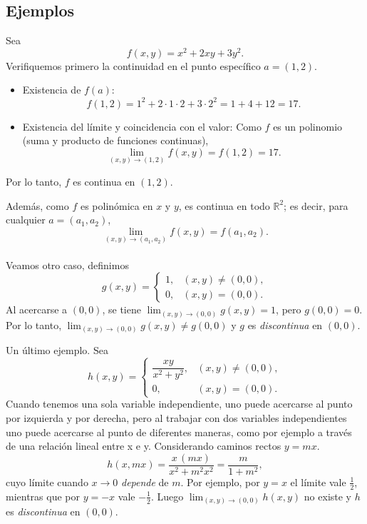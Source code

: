 \documentclass{article}
\begin{document}
\subsection*{Ejemplos}

Sea
\[
f(x,y)=x^{2}+2xy+3y^{2}.
\]
Verifiquemos primero la continuidad en el punto específico \(a=(1,2)\).

\begin{itemize}
  \item {\color{teal}Existencia de \(f(a)\):} 
  \[
  f(1,2)=1^{2}+2\cdot1\cdot2+3\cdot2^{2}=1+4+12=17.
  \]
  \item {\color{teal}Existencia del límite y coincidencia con el valor:}
  Como \(f\) es un polinomio (suma y producto de funciones continuas),
  \[
  \lim_{(x,y)\to(1,2)}f(x,y)
  = f(1,2)=17.
  \]
\end{itemize}
Por lo tanto, {\color{teal}\(f\) es continua en \((1,2)\)}.

Además, como \(f\) es polinómica en \(x\) y \(y\), es {\color{teal}continua en todo \(\mathbb{R}^{2}\)}; es decir, para cualquier \(a=(a_1,a_2)\),
\[
\lim_{(x,y)\to(a_1,a_2)} f(x,y)=f(a_1,a_2).
\]
\\
Veamos otro caso, definimos
\[
g(x,y)=
\begin{cases}
1, & (x,y)\neq(0,0),\\[4pt]
0, & (x,y)=(0,0).
\end{cases}
\]
Al acercarse a \((0,0)\), se tiene
\(\displaystyle \lim_{(x,y)\to(0,0)} g(x,y)=1\),
pero \(g(0,0)=0\).
{\color{teal}Por lo tanto, \(\displaystyle \lim_{(x,y)\to(0,0)} g(x,y)\neq g(0,0)\) y \(g\) es \emph{discontinua} en \((0,0)\).}

Un último ejemplo. Sea
\[
h(x,y)=
\begin{cases}
\dfrac{xy}{x^{2}+y^{2}}, & (x,y)\neq(0,0),\\[8pt]
0, & (x,y)=(0,0).
\end{cases}
\]
Cuando tenemos una sola variable independiente, uno puede acercarse al punto por izquierda y por derecha, pero al trabajar con dos variables independientes uno puede acercarse al punto de diferentes maneras, como por ejemplo a través de una relación lineal entre x e y. Considerando caminos rectos \(y=mx\).
\[
h(x,mx)=\frac{x\,(mx)}{x^{2}+m^{2}x^{2}}
= \frac{m}{1+m^{2}},
\]
cuyo límite cuando \(x\to0\) \emph{depende} de \(m\).
{\color{teal}Por ejemplo, por \(y=x\) el límite vale \(\tfrac{1}{2}\), mientras que por \(y=-x\) vale \(-\tfrac{1}{2}\).
Luego \(\displaystyle \lim_{(x,y)\to(0,0)} h(x,y)\) no existe y \(h\) es \emph{discontinua} en \((0,0)\).}
\end{document}
